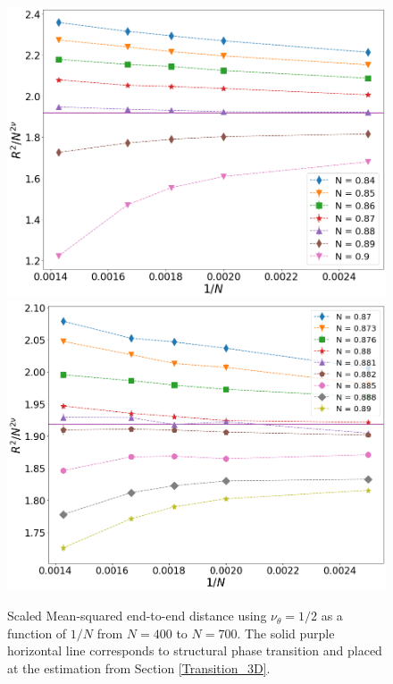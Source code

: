  \begin{figure} 
	\centering
	\includegraphics[scale=0.22]{Images/rscaling_longchainscross_3D.png} 
	\includegraphics[scale=0.22]{Images/rscaling_longchainscross_3D_deep.png} 
	\caption{  Scaled Mean-squared end-to-end distance using $\nu_{\theta}=1/2$ as a function of $1/N$ from $N=400$ to $N=700$.  The solid  purple horizontal line corresponds to structural phase transition and placed at the estimation from Section \ref{Transition_3D}.  }
	\label{fig:Rscaled3D}
\end{figure}

